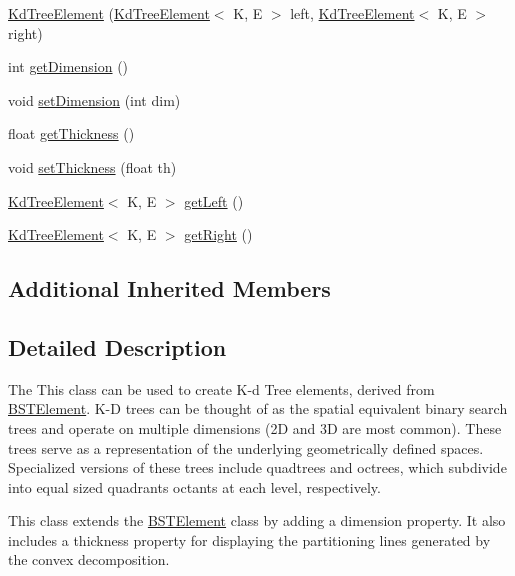 \begin{DoxyCompactItemize}
\item 
\mbox{\hyperlink{classbridges_1_1base_1_1_kd_tree_element_ad8cd8e37105af65a6ae06e743be9aebe}{Kd\+Tree\+Element}} (\mbox{\hyperlink{classbridges_1_1base_1_1_kd_tree_element}{Kd\+Tree\+Element}}$<$ K, E $>$ left, \mbox{\hyperlink{classbridges_1_1base_1_1_kd_tree_element}{Kd\+Tree\+Element}}$<$ K, E $>$ right)
\item 
int \mbox{\hyperlink{classbridges_1_1base_1_1_kd_tree_element_a2469fcfe38e921ae48338ef1fd347c4a}{get\+Dimension}} ()
\item 
void \mbox{\hyperlink{classbridges_1_1base_1_1_kd_tree_element_af3fa89cbd20fc2c3f30784db16b6dec4}{set\+Dimension}} (int dim)
\item 
float \mbox{\hyperlink{classbridges_1_1base_1_1_kd_tree_element_a27c0b086af284210855ee5f1c90e7484}{get\+Thickness}} ()
\item 
void \mbox{\hyperlink{classbridges_1_1base_1_1_kd_tree_element_a52412fc59c743a8a0ede057ed2451be9}{set\+Thickness}} (float th)
\item 
\mbox{\hyperlink{classbridges_1_1base_1_1_kd_tree_element}{Kd\+Tree\+Element}}$<$ K, E $>$ \mbox{\hyperlink{classbridges_1_1base_1_1_kd_tree_element_a257367edc8f204c973eb277dcb5d37be}{get\+Left}} ()
\item 
\mbox{\hyperlink{classbridges_1_1base_1_1_kd_tree_element}{Kd\+Tree\+Element}}$<$ K, E $>$ \mbox{\hyperlink{classbridges_1_1base_1_1_kd_tree_element_a990694a36d44aba5f844f1752692c8e6}{get\+Right}} ()
\end{DoxyCompactItemize}
\subsection*{Additional Inherited Members}


\subsection{Detailed Description}
The This class can be used to create K-\/d Tree elements, derived from \mbox{\hyperlink{classbridges_1_1base_1_1_b_s_t_element}{B\+S\+T\+Element}}. K-\/D trees can be thought of as the spatial equivalent binary search trees and operate on multiple dimensions (2D and 3D are most common). These trees serve as a representation of the underlying geometrically defined spaces. Specialized versions of these trees include quadtrees and octrees, which subdivide into equal sized quadrants octants at each level, respectively. 

This class extends the \mbox{\hyperlink{classbridges_1_1base_1_1_b_s_t_element}{B\+S\+T\+Element}} class by adding a dimension property. It also includes a thickness property for displaying the partitioning lines generated by the convex decomposition.

